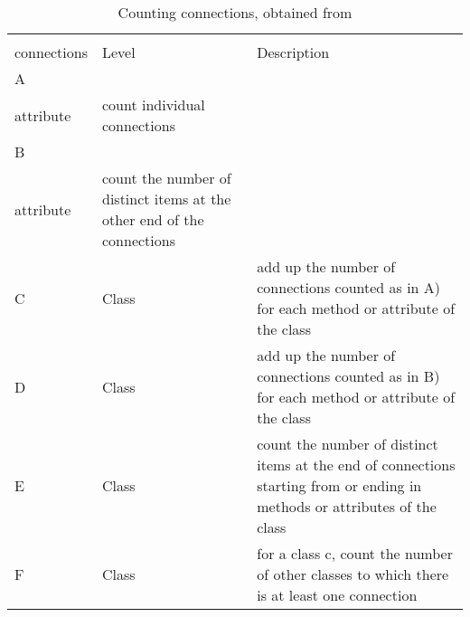 \begin{table}[htb!]
    \begin{center}
    \begin{tabularx}{\textwidth}{|l|l|X|}
    \hline
    \begin{tabular}[c]{@{}l@{}}Counting\\ connections\end{tabular} & Level & Description \\
    \hline\hline
    A   & \begin{tabular}[c]{@{}l@{}}Method or\\ attribute\end{tabular} & count individual connections  \\
     \hline
    B   & \begin{tabular}[c]{@{}l@{}}Method or\\ attribute\end{tabular} & count the number of distinct items at the other end of the connections  \\
     \hline
    C   & Class & add up the number of connections counted as in A) for each method or attribute of the class   \\
     \hline
    D   & Class & add up the number of connections counted as in B) for each method or attribute of the class   \\
     \hline
    E   & Class & count the number of distinct items at the end of connections starting from or ending in methods or attributes of the class    \\
     \hline
    F   & Class & for a class c, count the number of other classes to which there is at least  one connection  \\
    \hline
    \end{tabularx}
    \end{center}
    \caption{Counting connections, obtained from \cite{briand1999unified}}
    \label{table:counting-connections}
\end{table}

